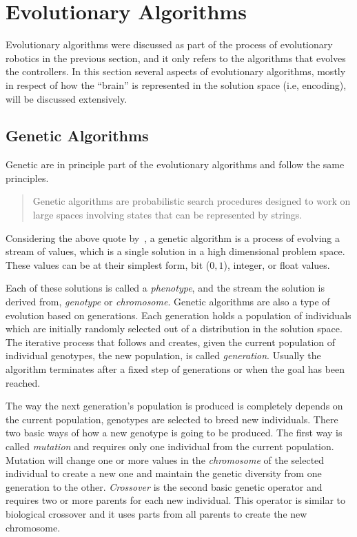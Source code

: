 \section{Evolutionary Algorithms}

Evolutionary algorithms were discussed as part of the process of evolutionary robotics in the previous section, and it only refers to the algorithms that evolves the controllers. In this section several aspects of evolutionary algorithms, mostly in respect of how the ``brain'' is represented in the solution space (i.e, encoding), will be discussed extensively.


\subsection{Genetic Algorithms}
Genetic are in principle part of the evolutionary algorithms and follow the same principles.

\begin{quote}Genetic algorithms are probabilistic search procedures designed to work on
large spaces involving states that can be represented by strings.\end{quote}

Considering the above quote by~\cite{goldberg1988genetic}, a genetic algorithm is a process of evolving a stream of values, which is a single solution in a high dimensional problem space. These values can be at their simplest form, bit ($0, 1$), integer, or float values. 

Each of these solutions is called a \emph{phenotype}, and the stream the solution is derived from, \emph{genotype} or \emph{chromosome}. Genetic algorithms are also a type of evolution based on generations. Each generation holds a population of individuals which are initially randomly selected out of a distribution in the solution space. The iterative process that follows and creates, given the current population of individual genotypes, the new population, is called \emph{generation}. Usually the algorithm terminates after a fixed step of generations or when the goal has been reached. 

The way the next generation's population is produced is completely depends on the current population, genotypes are selected to breed new individuals. There two basic ways of how a new genotype is going to be produced. The first way is called \emph{mutation} and requires only one individual from the current population. Mutation will change one or more values in the \emph{chromosome} of the selected individual to create a new one and maintain the genetic diversity from one generation to the other. \emph{Crossover} is the second basic genetic operator and requires two or more parents for each new individual. This operator is similar to biological crossover and it uses parts from all parents to create the new chromosome.

